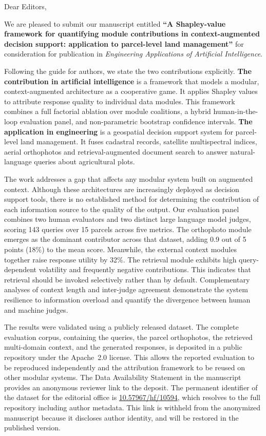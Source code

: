 \documentclass[a4paper,11pt]{letter}
\begin{document}
\normalsize Dear Editors,

\small \noindent
We are pleased to submit our manuscript entitled \textbf{``A Shapley-value framework for quantifying module contributions in context-augmented decision support: application to parcel-level land management''} for consideration for publication in \textit{Engineering Applications of Artificial Intelligence}.

\vspace{1pt}
Following the guide for authors, we state the two contributions explicitly. \textbf{The contribution in artificial intelligence} is a framework that models a modular, context-augmented architecture as a cooperative game. It applies Shapley values to attribute response quality to individual data modules. This framework combines a full factorial ablation over module coalitions, a hybrid human-in-the-loop evaluation panel, and non-parametric bootstrap confidence intervals. \textbf{The application in engineering} is a geospatial decision support system for parcel-level land management. It fuses cadastral records, satellite multispectral indices, aerial orthophotos and retrieval-augmented document search to answer natural-language queries about agricultural plots.

\vspace{1pt}
The work addresses a gap that affects any modular system built on augmented context. Although these architectures are increasingly deployed as decision support tools, there is no established method for determining the contribution of each information source to the quality of the output. Our evaluation panel combines two human evaluators and two distinct large language model judges, scoring 143 queries over 15 parcels across five metrics. The orthophoto module emerges as the dominant contributor across that dataset, adding 0.9 out of 5 points (18$\%$) to the mean score. Meanwhile, the external context modules together raise response utility by 32$\%$. The retrieval module exhibits high query-dependent volatility and frequently negative contributions. This indicates that retrieval should be invoked selectively rather than by default. Complementary analyses of context length and inter-judge agreement demonstrate the system resilience to information overload and quantify the divergence between human and machine judges.

\vspace{1pt}
The results were validated using a publicly released dataset. The complete evaluation corpus, containing the queries, the parcel orthophotos, the retrieved multi-domain context, and the generated responses, is deposited in a public repository under the Apache~2.0 license. This allows the reported evaluation to be reproduced independently and the attribution framework to be reused on other modular systems. The Data Availability Statement in the manuscript provides an anonymous reviewer link to the deposit. The permanent identifier of the dataset for the editorial office is \href{https://doi.org/10.57967/hf/10594}{10.57967/hf/10594}, which resolves to the full repository including author metadata. This link is withheld from the anonymized manuscript because it discloses author identity, and will be restored in the published version.
\end{document}
